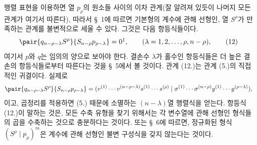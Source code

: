 
행렬 표현을 이용하면 열 $p_\rho$의 원소들 사이의 이차 관계(잘 알려져 있듯이 나머지 모든 관계가 여기서 따른다), 따라서 \S\ 1에 따르면 기본형의 계수에 관해 선형인, 열 $S^\rho$가 만족하는 관계를 불변적으로 세울 수 있다. 그것은 다음 항등식들이다.
\begin{equation}
 \pair{q_{n-\rho-\lambda}S^\rho}{S_{n-\rho}p_{\rho-\lambda}}=0\footnotemark,
 \qquad (\lambda=1,2,\ldots,\rho,n-\rho),
\tag{12}
\end{equation}
여기서 $p$와 $q$는 임의의 양으로 보아야 한다. 결손수 $\lambda$가 홀수인 항등식들은 더 높은 결손의 항등식들로부터 따른다는 것을 \S\ 5에서 볼 것이다. 관계 (12.)는 관계 (5.)의 직접적인 귀결이다. 실제로
\[
 \pair{q_{n-\rho-\lambda}S^\rho}{S_{n-\rho}p_{\rho-\lambda}}
 =(v^{(1)}\cdots v^{(n-\rho-\lambda)}s^{(1)}\cdots s^{(\rho)}\mid \sigma^{(1)}\cdots\sigma^{(n-\rho)}y^{(1)}\cdots y^{(\rho-\lambda)}),
\]
이고, 곱정리를 적용하면 (5.) 때문에 소멸하는 $(n-\lambda)$열 행렬식을 얻는다. 항등식 (12.)이 말하는 것은, 모든 수축 유형을 찾기 위해서는 각 변수열에 관해 선형인 형식들의 곱을 수축하는 것으로 충분하다는 것이다. 또는 \S\ 6에 따르면, 정규화된 형식 $(S^\rho\mid p_\rho)^m$은 계수에 관해 선형인 불변 구성식을 갖지 않는다는 것이다.
